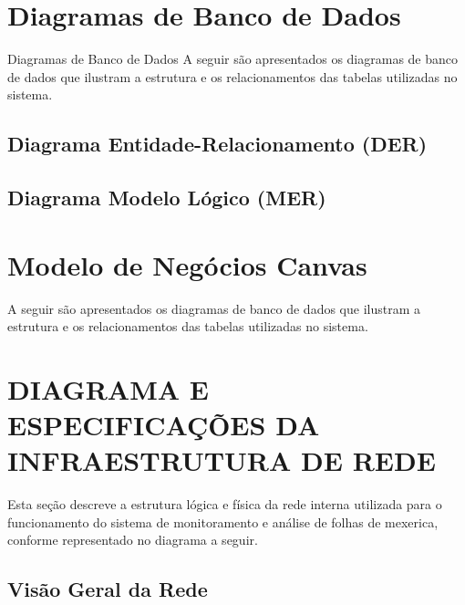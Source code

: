 \documentclass[
    a4paper,
    12pt,
    english,
    brazilian
]{article}
\begin{document}

\section{Diagramas de Banco de Dados}{Diagramas de Banco de Dados}
A seguir são apresentados os diagramas de banco de dados que ilustram a
estrutura e os relacionamentos das tabelas utilizadas no sistema.

    \subsection{\textbf{Diagrama Entidade-Relacionamento (DER)}}
    \label{sect:Diagrama-Entidade-Relacionamento}
    

    \subsection{\textbf{Diagrama Modelo Lógico (MER)}}
    \label{sect:Diagrama-Modelo-Lógico}
    


\section{Modelo de Negócios Canvas}
A seguir são apresentados os diagramas de banco de dados que ilustram a
estrutura e os relacionamentos das tabelas utilizadas no sistema.

\label{sect:Canvas}



\section{DIAGRAMA E ESPECIFICAÇÕES DA INFRAESTRUTURA DE REDE}
Esta seção descreve a estrutura lógica e física da rede interna utilizada para o
funcionamento do sistema de monitoramento e análise de folhas de mexerica,
conforme representado no diagrama a seguir.

    \subsection{\textbf{Visão Geral da Rede}}
    \label{sect:Visao-geral-da-Rede}
    
\end{document}
